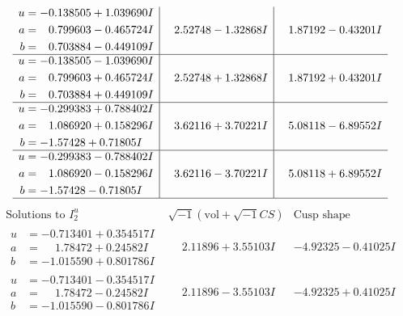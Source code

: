 \documentclass[1p]{elsarticle_modified}
\theoremstyle{definition}
\newcommand{\I}{\sqrt{-1}}
\begin{document}
$$\begin{array}{c|c|c}
\begin{aligned}
u &= -0.138505 + 1.039690 I \\
a &= \phantom{-}0.799603 - 0.465724 I \\
b &= \phantom{-}0.703884 - 0.449109 I\end{aligned}
 & \phantom{-}2.52748 - 1.32868 I & \phantom{-}1.87192 - 0.43201 I \\ \hline\begin{aligned}
u &= -0.138505 - 1.039690 I \\
a &= \phantom{-}0.799603 + 0.465724 I \\
b &= \phantom{-}0.703884 + 0.449109 I\end{aligned}
 & \phantom{-}2.52748 + 1.32868 I & \phantom{-}1.87192 + 0.43201 I \\ \hline\begin{aligned}
u &= -0.299383 + 0.788402 I \\
a &= \phantom{-}1.086920 + 0.158296 I \\
b &= -1.57428 + 0.71805 I\end{aligned}
 & \phantom{-}3.62116 + 3.70221 I & \phantom{-}5.08118 - 6.89552 I \\ \hline\begin{aligned}
u &= -0.299383 - 0.788402 I \\
a &= \phantom{-}1.086920 - 0.158296 I \\
b &= -1.57428 - 0.71805 I\end{aligned}
 & \phantom{-}3.62116 - 3.70221 I & \phantom{-}5.08118 + 6.89552 I\\
 \hline 
 \end{array}$$\newpage$$\begin{array}{c|c|c}  
\text{Solutions to }I^u_{2}& \I (\text{vol} + \sqrt{-1}CS) & \text{Cusp shape}\\
 \hline 
\begin{aligned}
u &= -0.713401 + 0.354517 I \\
a &= \phantom{-}1.78472 + 0.24582 I \\
b &= -1.015590 + 0.801786 I\end{aligned}
 & \phantom{-}2.11896 + 3.55103 I & -4.92325 - 0.41025 I \\ \hline\begin{aligned}
u &= -0.713401 - 0.354517 I \\
a &= \phantom{-}1.78472 - 0.24582 I \\
b &= -1.015590 - 0.801786 I\end{aligned}
 & \phantom{-}2.11896 - 3.55103 I & -4.92325 + 0.41025 I \\ \hline\begin{aligned}

\end{aligned}
\end{array}$$
\end{document}
